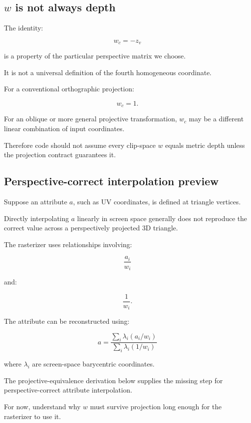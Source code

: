 \subsection{\texorpdfstring{\(w\) is not always depth}{w is not always depth}}\label{02-foundations-ii-ch033-w-is-not-always-depth}

The identity:

\[
 w_c=-z_v
\]

is a property of the particular perspective matrix we choose.

It is not a universal definition of the fourth homogeneous coordinate.

For a conventional orthographic projection:

\[
 w_c=1.
\]

For an oblique or more general projective transformation, \(w_c\) may be a different linear combination of input coordinates.

Therefore code should not assume every clip-space \(w\) equals metric depth unless the projection contract guarantees it.

\subsection{Perspective-correct interpolation preview}\label{02-foundations-ii-ch033-perspective-correct-interpolation-preview}

Suppose an attribute \(a\), such as UV coordinates, is defined at triangle vertices.

Directly interpolating \(a\) linearly in screen space generally does not reproduce the correct value across a perspectively projected 3D triangle.

The rasterizer uses relationships involving:

\[
 \frac{a_i}{w_i}
\]

and:

\[
 \frac1{w_i}.
\]

The attribute can be reconstructed using:

\[
 \boxed{ a= \frac{ \sum_i\lambda_i(a_i/w_i) }{ \sum_i\lambda_i(1/w_i) } }
\]

where \(\lambda_i\) are screen-space barycentric coordinates.

The projective-equivalence derivation below supplies the missing step for perspective-correct attribute interpolation.

For now, understand why \(w\) must survive projection long enough for the rasterizer to use it.

